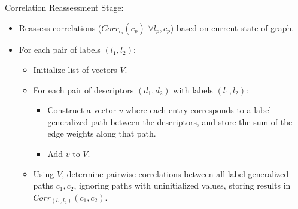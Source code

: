 \documentclass[a4paper]{article}
\begin{document}
\begin{itemize}
\begin{itemize}
\begin{itemize}
\begin{itemize}
            \end{itemize}
        \end{itemize}
    \end{itemize}
    Correlation Reassessment Stage:
    \begin{itemize}
        \item Reassess correlations ($Corr_{l_p}(c_p)$ $\forall l_p, c_p$) based
            on current state of graph.
        \item For each pair of labels $(l_1, l_2)$:
        \begin{itemize}
            \item Initialize list of vectors $V$.
            \item For each pair of descriptors $(d_1, d_2)$ with labels $(l_1,
                l_2)$:
            \begin{itemize}
                \item Construct a vector $v$ where each entry corresponds to a
                    label-generalized path between the descriptors, and store
                    the sum of the edge weights along that path.
                \item Add $v$ to $V$.
            \end{itemize}
            \item Using $V$, determine pairwise correlations between all
                label-generalized paths $c_1, c_2$, ignoring paths with
                uninitialized values, storing results in 
                $Corr_{(l_1, l_2)}(c_1, c_2)$.
        \end{itemize}
    \end{itemize}
\end{itemize}
\end{document}

